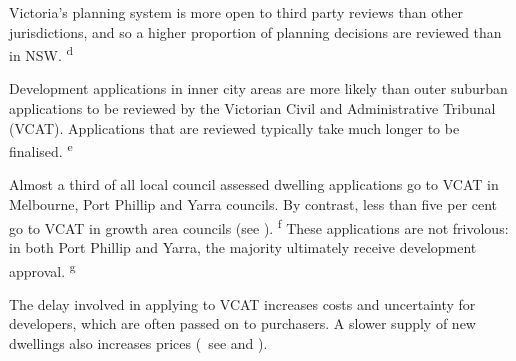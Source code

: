 	\begin{boxshell}
	\begin{fullpage}
	  \begin{mdframed}[style=GrattanFrameBoxB]
    \addtolength{\columnsep}{-23.8pt}%
	  \begin{multicols}{2}
	  \setlength{\parskip}{4pt plus 1pt minus 1pt}
	  \RaggedRight

		Victoria's planning system is more open to third party reviews than other jurisdictions, and so a higher proportion of planning decisions are reviewed than in NSW.%
		    \textsuperscript{d}

		Development applications in inner city areas are more likely than outer suburban applications to be reviewed by the Victorian Civil and Administrative Tribunal (VCAT). Applications that are reviewed typically take much longer to be finalised.%
			\textsuperscript{e}

		Almost a third of all local council assessed dwelling applications go to VCAT in Melbourne, Port Phillip and Yarra councils. By contrast, less than five per cent go to VCAT in growth area councils (see ).%
			\textsuperscript{f}
        These applications are not frivolous: in both Port Phillip and Yarra, the majority ultimately receive development approval.%
        	\textsuperscript{g}

        The delay involved in applying to VCAT increases costs and uncertainty for developers, which are often passed on to purchasers. A slower supply of new dwellings also increases prices (\eg~see \textcite{Mayer_Somerville_2000_land_use_regulation} and ).



\end{multicols}
\end{mdframed}
\end{fullpage}
\end{boxshell}
